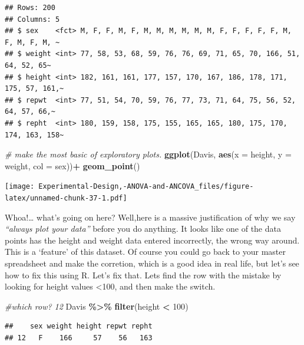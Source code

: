 \documentclass[
]{book}
\newenvironment{Shaded}{\begin{snugshade}}{\end{snugshade}}
\newcommand{\AttributeTok}[1]{\textcolor[rgb]{0.13,0.29,0.53}{#1}}
\newcommand{\CommentTok}[1]{\textcolor[rgb]{0.56,0.35,0.01}{\textit{#1}}}
\newcommand{\DecValTok}[1]{\textcolor[rgb]{0.00,0.00,0.81}{#1}}
\newcommand{\FunctionTok}[1]{\textcolor[rgb]{0.13,0.29,0.53}{\textbf{#1}}}
\newcommand{\NormalTok}[1]{#1}
\newcommand{\SpecialCharTok}[1]{\textcolor[rgb]{0.81,0.36,0.00}{\textbf{#1}}}
\begin{document}
\begin{verbatim}
## Rows: 200
## Columns: 5
## $ sex    <fct> M, F, F, M, F, M, M, M, M, M, M, F, F, F, F, F, M, F, M, F, M, ~
## $ weight <int> 77, 58, 53, 68, 59, 76, 76, 69, 71, 65, 70, 166, 51, 64, 52, 65~
## $ height <int> 182, 161, 161, 177, 157, 170, 167, 186, 178, 171, 175, 57, 161,~
## $ repwt  <int> 77, 51, 54, 70, 59, 76, 77, 73, 71, 64, 75, 56, 52, 64, 57, 66,~
## $ repht  <int> 180, 159, 158, 175, 155, 165, 165, 180, 175, 170, 174, 163, 158~
\end{verbatim}

\begin{Shaded}
\begin{Highlighting}[]
\CommentTok{\# make the most basic of exploratory plots.}
\FunctionTok{ggplot}\NormalTok{(Davis, }\FunctionTok{aes}\NormalTok{(}\AttributeTok{x =}\NormalTok{ height, }\AttributeTok{y =}\NormalTok{ weight, }\AttributeTok{col =}\NormalTok{ sex))}\SpecialCharTok{+}
  \FunctionTok{geom\_point}\NormalTok{()}
\end{Highlighting}
\end{Shaded}

\texttt{[image: Experimental-Design,-ANOVA-and-ANCOVA\_files/figure-latex/unnamed-chunk-37-1.pdf]}

Whoa!\ldots{} what's going on here? Well,here is a massive justification of why we say \emph{``always plot your data''} before you do anything. It looks like one of the data points has the height and weight data entered incorrectly, the wrong way around. This is a `feature' of this dataset. Of course you could go back to your master spreadsheet and make the corretion, which is a good idea in real life, but let's see how to fix this using R. Let's fix that. Lets find the row with the mistake by looking for height values \textless100, and then make the switch.

\begin{Shaded}
\begin{Highlighting}[]
\CommentTok{\#which row? 12}
\NormalTok{Davis }\SpecialCharTok{\%\textgreater{}\%} \FunctionTok{filter}\NormalTok{(height }\SpecialCharTok{\textless{}} \DecValTok{100}\NormalTok{)}
\end{Highlighting}
\end{Shaded}

\begin{verbatim}
##    sex weight height repwt repht
## 12   F    166     57    56   163
\end{verbatim}

\begin{Shaded}
\end{Shaded}
\end{document}
